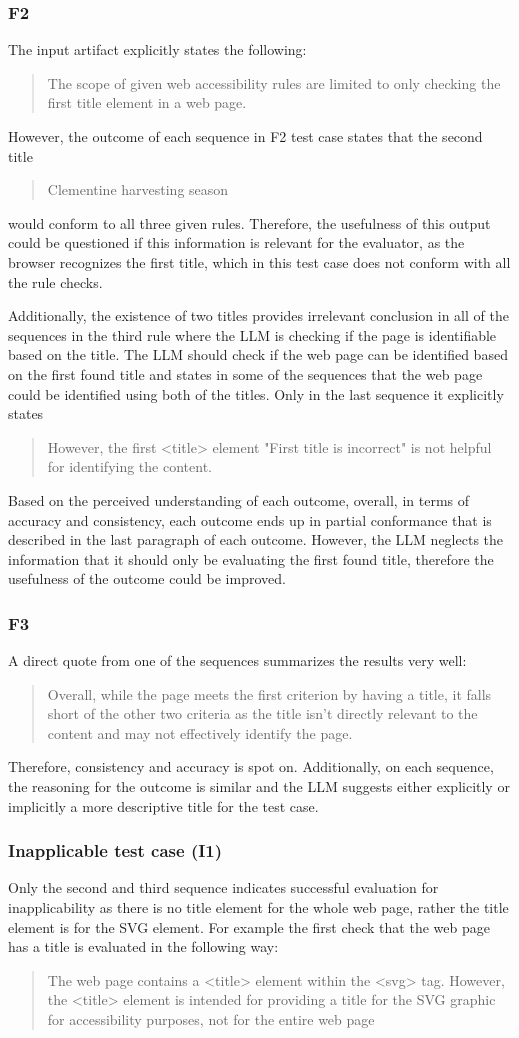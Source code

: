 \subsubsection{F2}

The input artifact explicitly states the following: \blockquote{The scope of given web accessibility rules are limited to only checking the first title element in a web page.}. However, the outcome of each sequence in F2 test case states that the second title \blockquote{Clementine harvesting season} would conform to all three given rules. Therefore, the usefulness of this output could be questioned if this information is relevant for the evaluator, as the browser recognizes the first title, which in this test case does not conform with all the rule checks.

Additionally, the existence of two titles provides irrelevant conclusion in all of the sequences in the third rule where the LLM is checking if the page is identifiable based on the title. The LLM should check if the web page can be identified based on the first found title and states in some of the sequences that the web page could be identified using both of the titles. Only in the last sequence it explicitly states \blockquote{However, the first <title> element "First title is incorrect" is not helpful for identifying the content.}

Based on the perceived understanding of each outcome, overall, in terms of accuracy and consistency, each outcome ends up in partial conformance that is described in the last paragraph of each outcome. However, the LLM neglects the information that it should only be evaluating the first found title, therefore the usefulness of the outcome could be improved.

\subsubsection{F3}

A direct quote from one of the sequences summarizes the results very well: \blockquote{Overall, while the page meets the first criterion by having a title, it falls short of the other two criteria as the title isn't directly relevant to the content and may not effectively identify the page.}. Therefore, consistency and accuracy is spot on. Additionally, on each sequence, the reasoning for the outcome is similar and the LLM suggests either explicitly or implicitly a more descriptive title for the test case.

\subsubsection{Inapplicable test case (I1)}

Only the second and third sequence indicates successful evaluation for inapplicability as there is no title element for the whole web page, rather the title element is for the SVG element. For example the first check that the web page has a title is evaluated in the following way: \blockquote{The web page contains a <title> element within the <svg> tag. However, the <title> element is intended for providing a title for the SVG graphic for accessibility purposes, not for the entire web page}. 